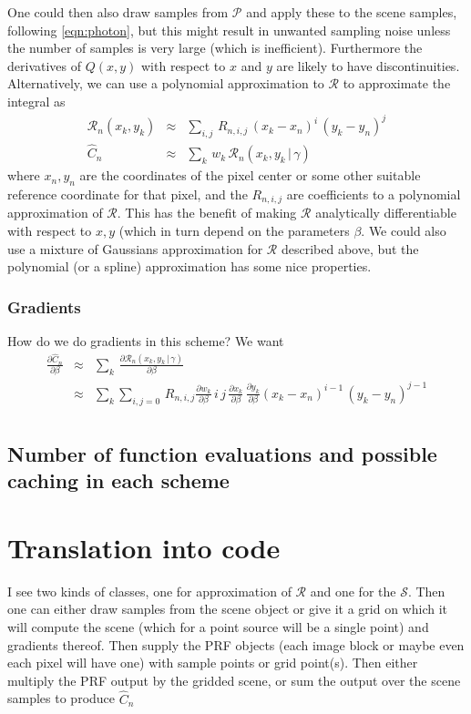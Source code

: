 \documentclass[modern]{aastex6}
\newcommand{\given}{\,|\,}
\newcommand{\countrate}{\hat{C}}
\newcommand{\psf}{\mathcal{P}}
\newcommand{\prf}{\mathcal{R}}
\newcommand{\qe}{Q}
\newcommand{\scene}{\mathcal{S}}
\begin{document}
One could then also draw samples from $\psf$ and apply these to the scene samples, following \ref{eqn:photon},
 but this might result in unwanted sampling noise unless the number of samples is very large (which is inefficient).
Furthermore the derivatives of $\qe(x, y)$ with respect to $x$ and $y$ are likely to have discontinuities.
Alternatively, we can use a polynomial approximation to $\prf$ to approximate the integral as
\begin{eqnarray}
\prf_n(x_k, y_k) & \approx & \sum_{i,j} \, R_{n, i, j} \, (x_k - x_n)^i \, (y_k - y_n)^j \\
\countrate_n & \approx & \sum_k \, w_k \, \prf_n(x_k, y_k \given \gamma) \nonumber
\end{eqnarray}
where $x_n, y_n$ are the coordinates of the pixel center or some other suitable reference coordinate for that pixel, 
and the $R_{n,i,j}$ are coefficients to a polynomial approximation of $\prf$.
This has the benefit of making $\prf$ analytically differentiable with respect to $x, y$ (which in turn depend on the parameters $\beta$.
We could also use a mixture of Gaussians approximation for $\prf$ described above, but the polynomial  (or a spline) approximation has some nice properties.


\subsubsection{Gradients}
How do we do gradients in this scheme?  We want 
\begin{eqnarray}
\frac{\partial\countrate_n}{\partial\beta} & \approx & \sum_k \, \frac{\partial\prf_n(x_k, y_k \given \gamma)}{\partial \beta} \\
& \approx & \sum_k\sum_{i,j=0} \, R_{n, i, j} \frac{\partial w_k}{\partial \beta}\, i \, j \, \frac{\partial x_k}{\partial \beta}\, \frac{\partial y_k}{\partial \beta} (x_k - x_n)^{i-1} \, (y_k - y_n)^{j-1} \\
\end{eqnarray}


\subsection{Number of function evaluations and possible caching in each scheme}


\section{Translation into code}
I see two kinds of classes, one for approximation of $\prf$ and one for the $\scene$.
Then one can either draw samples from the scene object or give it a grid on which it will compute the scene (which for a point source will be a single point) and gradients thereof.
Then supply the PRF objects (each image block or maybe even each pixel will have one) with sample points or grid point(s). 
Then either multiply the PRF output by the gridded scene, or sum the output over the scene samples to produce $\countrate_n$
\end{document}
